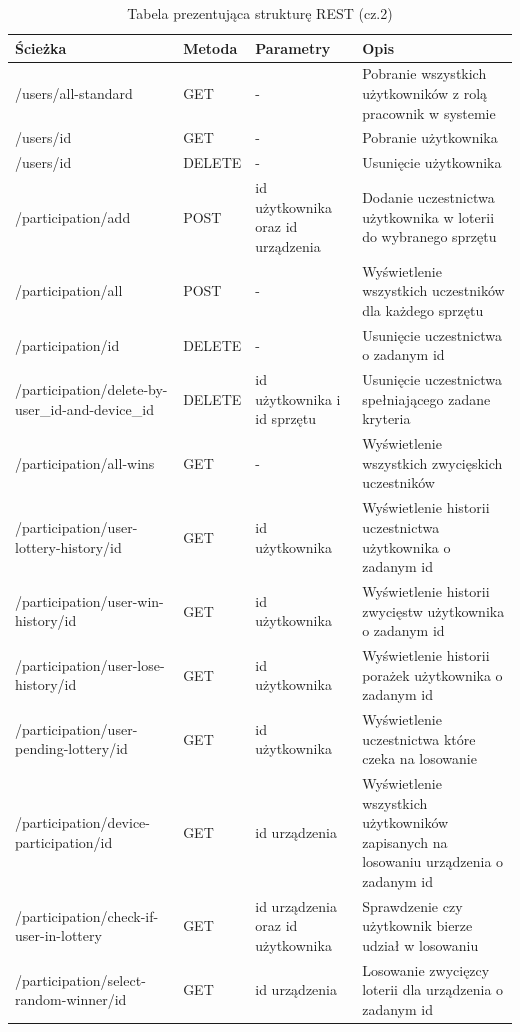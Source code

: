 \begin{table}[H] \small
	\centering
\caption{Tabela prezentująca strukturę REST (cz.2)}
\label{tab:rest2}	 
\begin{tabularx}{\linewidth}{|X|l|p{3cm}|X|}\hline
    Ścieżka & Metoda & Parametry & Opis  \\
    \hline \hline
		 /users/all-standard	& GET & -& Pobranie wszystkich użytkowników z rolą pracownik w systemie\\
		\hline
		 /users/id & GET & - & Pobranie użytkownika\\
		\hline
		 /users/id & DELETE & - & Usunięcie użytkownika\\
		\hline
		 /participation/add & POST & id użytkownika oraz id urządzenia & Dodanie uczestnictwa użytkownika w loterii do wybranego sprzętu\\
		\hline
		 /participation/all& POST & - & Wyświetlenie wszystkich uczestników dla każdego sprzętu\\
		\hline
		 /participation/id & DELETE & - & Usunięcie uczestnictwa o zadanym id\\
		\hline
		 /participation/delete-by-user\_id-and-device\_id& DELETE & id użytkownika i id sprzętu & Usunięcie uczestnictwa spełniającego zadane kryteria\\
		\hline
		 /participation/all-wins& GET & - & Wyświetlenie wszystkich zwycięskich uczestników\\
		\hline
		 /participation/user-lottery-history/id & GET& id użytkownika & Wyświetlenie historii uczestnictwa użytkownika o zadanym id\\
		\hline
		 /participation/user-win-history/id & GET& id użytkownika & Wyświetlenie historii zwycięstw użytkownika o zadanym id\\
		\hline
		 /participation/user-lose-history/id & GET& id użytkownika & Wyświetlenie historii porażek użytkownika o zadanym id\\
		\hline
		 /participation/user-pending-lottery/id & GET& id użytkownika & Wyświetlenie uczestnictwa które czeka na losowanie\\
		\hline
		 /participation/device-participation/id& GET& id urządzenia & Wyświetlenie wszystkich użytkowników zapisanych na losowaniu urządzenia o zadanym id\\
		\hline
		 /participation/check-if-user-in-lottery& GET& id urządzenia oraz id użytkownika& Sprawdzenie czy użytkownik bierze udział w losowaniu\\
		\hline
		 /participation/select-random-winner/id& GET& id urządzenia& Losowanie zwycięzcy loterii dla urządzenia o zadanym id\\
		\hline
\end{tabularx}
\end{table}



